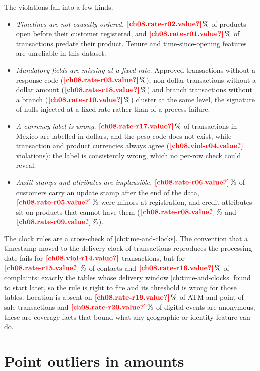 The violations fall into a few kinds.
\begin{itemize}
  \item \emph{Timelines are not causally ordered.} $\est{ch08.rate-r02}{value}\,\%$ of products open before their
  customer registered, and $\est{ch08.rate-r01}{value}\,\%$ of transactions predate their product. Tenure and
  time-since-opening features are unreliable in this dataset.
  \item \emph{Mandatory fields are missing at a fixed rate.} Approved transactions without a response code
  ($\est{ch08.rate-r03}{value}\,\%$), non-dollar transactions without a dollar amount ($\est{ch08.rate-r18}{value}\,\%$)
  and branch transactions without a branch ($\est{ch08.rate-r10}{value}\,\%$) cluster at the same level, the signature
  of nulls injected at a fixed rate rather than of a process failure.
  \item \emph{A currency label is wrong.} $\est{ch08.rate-r17}{value}\,\%$ of transactions in Mexico are labelled in
  dollars, and the peso code does not exist, while transaction and product currencies always agree
  ($\est{ch08.viol-r04}{value}$ violations): the label is consistently wrong, which no per-row check could reveal.
  \item \emph{Audit stamps and attributes are implausible.} $\est{ch08.rate-r06}{value}\,\%$ of customers carry an
  update stamp after the end of the data, $\est{ch08.rate-r05}{value}\,\%$ were minors at registration, and credit
  attributes sit on products that cannot have them ($\est{ch08.rate-r08}{value}\,\%$ and
  $\est{ch08.rate-r09}{value}\,\%$).
\end{itemize}
The clock rules are a cross-check of \cref{ch:time-and-clocks}. The convention that a timestamp moved to the delivery
clock of transactions reproduces the processing date fails for $\est{ch08.viol-r14}{value}$ transactions, but for
$\est{ch08.rate-r15}{value}\,\%$ of contacts and $\est{ch08.rate-r16}{value}\,\%$ of complaints: exactly the tables
whose delivery window \cref{ch:time-and-clocks} found to start later, so the rule is right to fire and its threshold is
wrong for those tables. Location is absent on $\est{ch08.rate-r19}{value}\,\%$ of ATM and point-of-sale transactions and
$\est{ch08.rate-r20}{value}\,\%$ of digital events are anonymous; these are coverage facts that bound what any
geographic or identity feature can do.

\section{Point outliers in amounts}\label{sec:ad-points}

